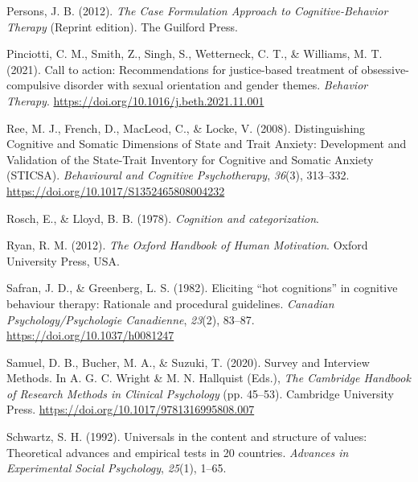 \documentclass[
  man,floatsintext]{apa7}
\newlength{\cslhangindent}
\newlength{\cslentryspacingunit} %
\newenvironment{CSLReferences}[2] %
 {%
  \setlength{\parindent}{0pt}
  \ifodd #1
  \let\oldpar\par
  \def\par{\hangindent=\cslhangindent\oldpar}
  \fi
  \setlength{\parskip}{#2\cslentryspacingunit}
 }%
 {}
\begin{document}
\begin{CSLReferences}{1}{0}
\leavevmode{}%
Persons, J. B. (2012). \emph{The Case Formulation Approach to Cognitive-Behavior Therapy} (Reprint edition). The Guilford Press.

\leavevmode{}%
Pinciotti, C. M., Smith, Z., Singh, S., Wetterneck, C. T., \& Williams, M. T. (2021). Call to action: Recommendations for justice-based treatment of obsessive-compulsive disorder with sexual orientation and gender themes. \emph{Behavior Therapy}. \url{https://doi.org/10.1016/j.beth.2021.11.001}

\leavevmode{}%
Ree, M. J., French, D., MacLeod, C., \& Locke, V. (2008). Distinguishing Cognitive and Somatic Dimensions of State and Trait Anxiety: Development and Validation of the State-Trait Inventory for Cognitive and Somatic Anxiety (STICSA). \emph{Behavioural and Cognitive Psychotherapy}, \emph{36}(3), 313--332. \url{https://doi.org/10.1017/S1352465808004232}

\leavevmode{}%
Rosch, E., \& Lloyd, B. B. (1978). \emph{Cognition and categorization}.

\leavevmode{}%
Ryan, R. M. (2012). \emph{The Oxford Handbook of Human Motivation}. Oxford University Press, USA.

\leavevmode{}%
Safran, J. D., \& Greenberg, L. S. (1982). Eliciting {``hot cognitions''} in cognitive behaviour therapy: Rationale and procedural guidelines. \emph{Canadian Psychology/Psychologie Canadienne}, \emph{23}(2), 83--87. \url{https://doi.org/10.1037/h0081247}

\leavevmode{}%
Samuel, D. B., Bucher, M. A., \& Suzuki, T. (2020). Survey and Interview Methods. In A. G. C. Wright \& M. N. Hallquist (Eds.), \emph{The Cambridge Handbook of Research Methods in Clinical Psychology} (pp. 45--53). Cambridge University Press. \url{https://doi.org/10.1017/9781316995808.007}

\leavevmode{}%
Schwartz, S. H. (1992). Universals in the content and structure of values: Theoretical advances and empirical tests in 20 countries. \emph{Advances in Experimental Social Psychology}, \emph{25}(1), 1--65.


\end{CSLReferences}
\end{document}
